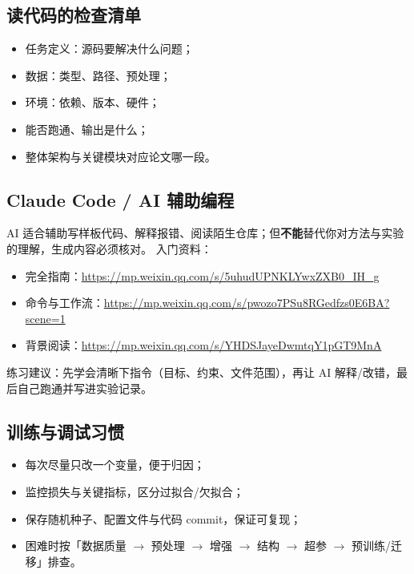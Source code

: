 \subsection{读代码的检查清单}
\begin{itemize}
  \item 任务定义：源码要解决什么问题；
  \item 数据：类型、路径、预处理；
  \item 环境：依赖、版本、硬件；
  \item 能否跑通、输出是什么；
  \item 整体架构与关键模块对应论文哪一段。
\end{itemize}

\subsection{Claude Code / AI 辅助编程}
AI 适合辅助写样板代码、解释报错、阅读陌生仓库；但\textbf{不能}替代你对方法与实验的理解，生成内容必须核对。
入门资料：
\begin{itemize}
  \item 完全指南：\url{https://mp.weixin.qq.com/s/5uhudUPNKLYwxZXB0_IH_g}
  \item 命令与工作流：\url{https://mp.weixin.qq.com/s/pwozo7PSu8RGedfzs0E6BA?scene=1}
  \item 背景阅读：\url{https://mp.weixin.qq.com/s/YHDSJayeDwmtqY1pGT9MnA}
\end{itemize}
练习建议：先学会清晰下指令（目标、约束、文件范围），再让 AI 解释/改错，最后自己跑通并写进实验记录。

\subsection{训练与调试习惯}
\begin{itemize}
  \item 每次尽量只改一个变量，便于归因；
  \item 监控损失与关键指标，区分过拟合/欠拟合；
  \item 保存随机种子、配置文件与代码 commit，保证可复现；
  \item 困难时按「数据质量 $\rightarrow$ 预处理 $\rightarrow$ 增强 $\rightarrow$ 结构 $\rightarrow$ 超参 $\rightarrow$ 预训练/迁移」排查。
\end{itemize}
